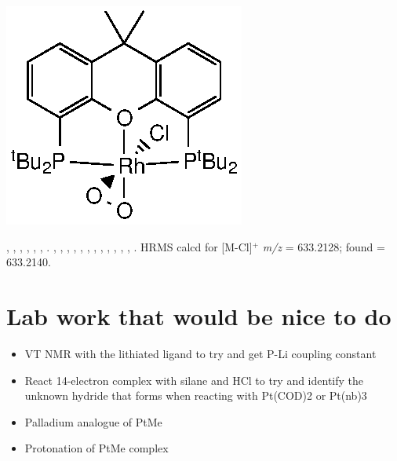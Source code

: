 \begin{structure}[h]
\begin{center}
\includegraphics{../Structures/CtBuRhClO2.eps}
\end{center}
\end{structure}

,
,
,
,
,
,
.
,
,
,
,
,
,
,
,
,
,
,
,
.
HRMS calcd for  [M-Cl]$^+$ \emph{m/z} = 633.2128; found = 633.2140.



\section{Lab work that would be nice to do}
\begin{itemize}
\item{VT NMR with the lithiated ligand to try and get P-Li coupling constant}
\item{React 14-electron complex with silane and HCl to try and identify the unknown hydride that forms when reacting with Pt(COD)2 or Pt(nb)3}
\item{Palladium analogue of PtMe}
\item{Protonation of PtMe complex}
\end{itemize}

